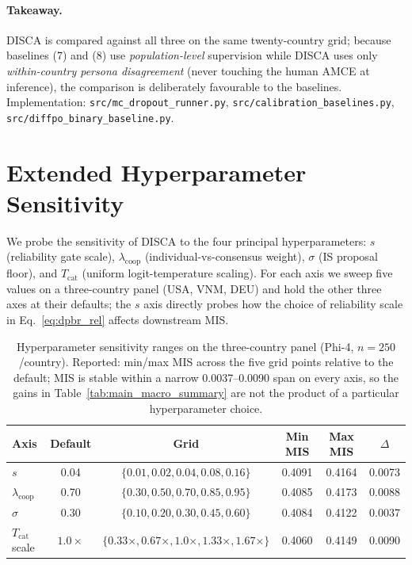 \documentclass{article}
\begin{document}
\paragraph{Takeaway.} DISCA is compared against all three on the same
twenty-country grid; because baselines (7) and (8) use
\emph{population-level} supervision while DISCA uses only
\emph{within-country persona disagreement} (never touching the human AMCE
at inference), the comparison is deliberately favourable to the
baselines. Implementation:
\texttt{src/mc\_dropout\_runner.py},
\texttt{src/calibration\_baselines.py},
\texttt{src/diffpo\_binary\_baseline.py}.

\section{Extended Hyperparameter Sensitivity}
\label{app:r2_hparam_sensitivity}

We probe the sensitivity of DISCA to the four principal
hyperparameters: $s$ (reliability gate scale), $\lambda_{\text{coop}}$
(individual-vs-consensus weight), $\sigma$ (IS proposal floor), and
$T_{\text{cat}}$ (uniform logit-temperature scaling). For each axis we sweep
five values on a three-country panel (USA, VNM, DEU) and hold the other
three axes at their defaults; the $s$ axis directly probes how the choice
of reliability scale in Eq.~\ref{eq:dpbr_rel} affects downstream MIS.

\begin{table}[h]\centering\small
\caption{Hyperparameter sensitivity ranges on the three-country panel
(Phi-4, $n{=}250$/country). Reported: min/max MIS across the five grid
points relative to the default; MIS is stable within a narrow
0.0037--0.0090 span
on every axis, so the gains in Table~\ref{tab:main_macro_summary} are
not the product of a particular hyperparameter choice.}
\label{tab:r2_hparam_sensitivity}
\setlength{\tabcolsep}{4pt}
\begin{tabular}{lccccc}\toprule
Axis & Default & Grid & Min MIS & Max MIS & $\Delta$ \\\midrule
$s$                    & 0.04 & $\{0.01, 0.02, 0.04, 0.08, 0.16\}$ & 0.4091 & 0.4164 & 0.0073 \\
$\lambda_{\text{coop}}$ & 0.70 & $\{0.30, 0.50, 0.70, 0.85, 0.95\}$ & 0.4085 & 0.4173 & 0.0088 \\
$\sigma$               & 0.30 & $\{0.10, 0.20, 0.30, 0.45, 0.60\}$ & 0.4084 & 0.4122 & 0.0037 \\
$T_{\text{cat}}$ scale & $1.0\times$ & $\{0.33\times, 0.67\times, 1.0\times, 1.33\times, 1.67\times\}$ & 0.4060 & 0.4149 & 0.0090 \\\bottomrule
\end{tabular}\end{table}
\end{document}
